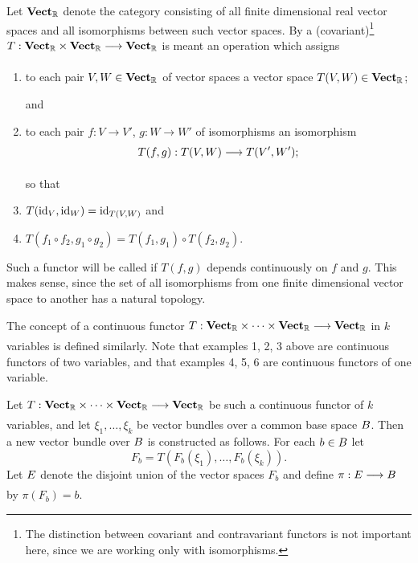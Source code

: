 \documentclass[../main]{subfiles}
\begin{document}
\begin{definition}\label{def:03.04}
Let $\mathbf{Vect}_{\mathbb{R}}$ denote the category consisting of all finite dimensional real
vector spaces and all isomorphisms between such vector spaces. By a
(covariant)\footnote{The distinction between covariant and contravariant functors is not important here, since we are working only with isomorphisms.}  $T : \vectCat_{\mathbb{R}}\times\vectCat_{\mathbb{R}} \varrightarrow{} \vectCat_{\mathbb{R}}$ is meant an operation which assigns
\begin{enumerate}
	\item to each pair $V, W\in \mathbf{Vect}_{\mathbb{R}}$ of vector spaces a vector space $T(V, W)\in\mathbf{Vect}_{\mathbb{R}}$;

and

	\item to each pair $f : V \to V'$, $g : W \to W'$ of isomorphisms an isomorphism
	\[
	T(f, g): T(V, W) \varrightarrow{} T(V', W');
	\]

so that

	\item $T(\operatorname{id}_V,\operatorname{id}_W)=\operatorname{id}_{T(V,W)}$ and
	\item $T(f_{1} \circ f_{2}, g_{1} \circ g_{2})=T(f_{1}, g_{1}) \circ T(f_{2}, g_{2})$.
\end{enumerate}
Such a functor will be called  if $T(f, g)$ depends continuously on $f$ and $g$. This makes sense, since the set of all isomorphisms from one finite dimensional vector space to another has a natural topology.
\end{definition}


The concept of a continuous functor $T : \vectCat_{\mathbb{R}}\times\dots\times\vectCat_{\mathbb{R}}\varrightarrow{}\vectCat_{\mathbb{R}}$ in $k$ variables is defined similarly. Note that examples 1, 2, 3 above are continuous functors of two variables, and that examples 4, 5, 6 are continuous functors of one variable.

Let $T:\vectCat_{\mathbb{R}}\times\dots\times\vectCat_{\mathbb{R}}\varrightarrow{}\vectCat_{\mathbb{R}}$ be such a continuous functor of $k$ variables, and let $\xi_1,\dots,\xi_k$ be vector bundles over a common base space $B$. Then a new vector bundle over $B$ is constructed as follows. For each $b\in B$ let
\[
F_{b}=T(F_{b}(\xi_{1}), \dots, F_{b}(\xi_{k})).
\]
Let $E$ denote the disjoint union of the vector spaces $F_b$ and define
$\pi:\total \varrightarrow{} B$ by $\pi(F_b) = b$.
\end{document}
